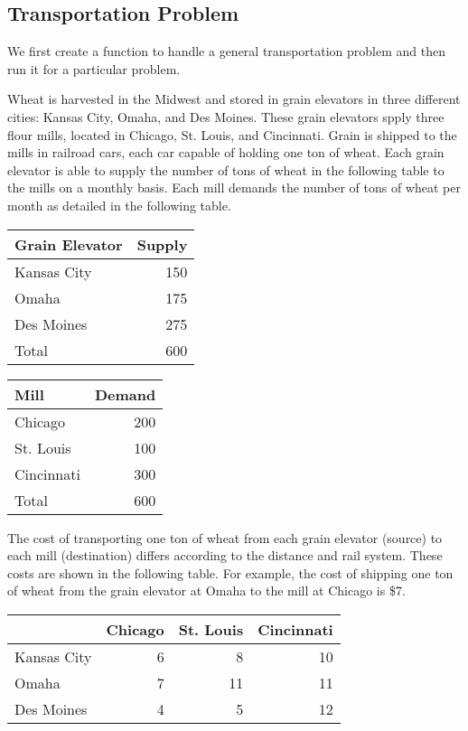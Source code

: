 \documentclass[11pt]{article}
\begin{document}
\subsection{Transportation Problem}
\label{sec:org5312109}
We first create a function to handle a general transportation problem and then run it for a particular problem.

Wheat is harvested in the Midwest and stored in grain elevators in three different cities: Kansas City, Omaha, and Des Moines.  These grain elevators spply three flour mills, located in Chicago, St. Louis, and Cincinnati.  Grain is shipped to the mills in railroad cars, each car capable of holding one ton of wheat.  Each grain elevator is able to supply the number of tons of wheat in the following table to the mills on a monthly basis.  Each mill demands the number of tons of wheat per month as detailed in the following table.

\begin{center}
\begin{tabular}{lr}
Grain Elevator & Supply\\
\hline
Kansas City & 150\\
Omaha & 175\\
Des Moines & 275\\
\hline
Total & 600\\
\end{tabular}
\end{center}

\begin{center}
\begin{tabular}{lr}
Mill & Demand\\
\hline
Chicago & 200\\
St. Louis & 100\\
Cincinnati & 300\\
\hline
Total & 600\\
\end{tabular}
\end{center}

The cost of transporting one ton of wheat from each grain elevator (source) to each mill (destination) differs according to the distance and rail system.  These costs are shown in the following table.  For example, the cost of shipping one ton of wheat from the grain elevator at Omaha to the mill at Chicago is \$7.

\begin{center}
\begin{tabular}{lrrr}
 & Chicago & St. Louis & Cincinnati\\
\hline
Kansas City & 6 & 8 & 10\\
Omaha & 7 & 11 & 11\\
Des Moines & 4 & 5 & 12\\
\end{tabular}
\end{center}
\end{document}
